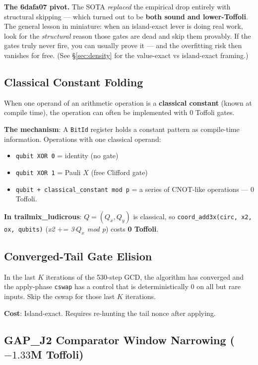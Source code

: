\documentclass[11pt,a4paper]{article}
\begin{document}
\textbf{The 6dafa07 pivot.} The SOTA \emph{replaced} the empirical drop entirely with structural
skipping --- which turned out to be \textbf{both sound and lower-Toffoli}. The general lesson in
miniature: when an island-exact lever is doing real work, look for the \emph{structural} reason those
gates are dead and skip them provably. If the gates truly never fire, you can usually prove it --- and
the overfitting risk then vanishes for free. (See \S\ref{sec:density} for the value-exact vs
island-exact framing.)

\subsection{Classical Constant Folding}

When one operand of an arithmetic operation is a \textbf{classical constant} (known at compile
time), the operation can often be implemented with 0 Toffoli gates.

\textbf{The mechanism}: A \texttt{BitId} register holds a constant pattern as compile-time
information. Operations with one classical operand:
\begin{itemize}
  \item \texttt{qubit XOR 0} = identity (no gate)
  \item \texttt{qubit XOR 1} = Pauli $X$ (free Clifford gate)
  \item \texttt{qubit + classical\_constant mod p} = a series of CNOT-like operations --- 0 Toffoli.
\end{itemize}

\textbf{In trailmix\_ludicrous}: $Q = (Q_x, Q_y)$ is classical, so \texttt{coord\_add3x(circ, x2,
ox, qubits)} (\textit{x2 $\mathrel{+}$= 3$\cdot Q_x$ mod p}) costs \textbf{0 Toffoli}.

\subsection{Converged-Tail Gate Elision}

In the last $K$ iterations of the 530-step GCD, the algorithm has converged and the apply-phase
\texttt{cswap} has a control that is deterministically 0 on all but rare inputs. Skip the cswap
for those last $K$ iterations.

\textbf{Cost}: Island-exact. Requires re-hunting the tail nonce after applying.

\subsection{GAP\_J2 Comparator Window Narrowing ($-1.33$M Toffoli)}
\end{document}
